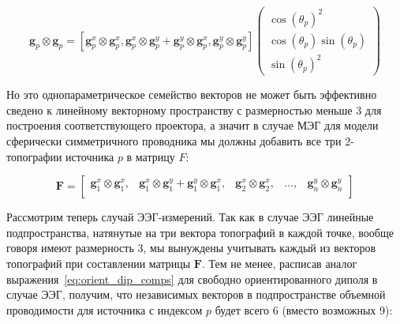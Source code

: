 \begin{equation*}
    \mathbf{g}_p \otimes \mathbf{g}_p =
    [\mathbf{g}_p^x \otimes \mathbf{g}_p^x, \mathbf{g}_p^x \otimes \mathbf{g}_p^y +
     \mathbf{g}_p^y \otimes \mathbf{g}_p^x, \mathbf{g}_p^y \otimes \mathbf{g}_p^y]
    \left({\begin{array}{ccc}
                \cos{(\theta_p)}^2 \\
                \cos{(\theta_p)} \sin{(\theta_p)} \\
                \sin{(\theta_p)}^2
    \end{array}}
    \right)
\end{equation*}

Но это однопараметрическое семейство векторов не может быть эффективно сведено к линейному векторному
пространству с размерностью меньше 3 для построения соответствующего проектора,
а значит в случае МЭГ для модели сферически симметричного проводника мы должны добавить все три
2-топографии источника $p$ в матрицу $F$:

\begin{equation}
    \mathbf{F} =
    \begin{bmatrix}
        \mathbf{g}_1^x \otimes \mathbf{g}_1^x, &
        \mathbf{g}_1^x \otimes \mathbf{g}_1^y + \mathbf{g}_1^y \otimes \mathbf{g}_1^x, &
        \mathbf{g}_2^x \otimes \mathbf{g}_2^x, &
        \dots, & \mathbf{g}_n^y \otimes \mathbf{g}_n^y \\
    \end{bmatrix}
\end{equation}

Рассмотрим теперь случай ЭЭГ-измерений. Так как в случае ЭЭГ линейные подпространства, натянутые
на три вектора топографий в каждой точке, вообще говоря имеют размерность 3, мы вынуждены
учитывать каждый из векторов топографий при составлении матрицы $\mathbf{F}$.
Тем не менее, расписав аналог выражения~\ref{eq:orient_dip_comps}
для свободно ориентированного диполя в случае ЭЭГ,
получим, что независимых векторов  в подпространстве объемной проводимости для источника с индексом $p$
будет всего 6 (вместо возможных 9):


